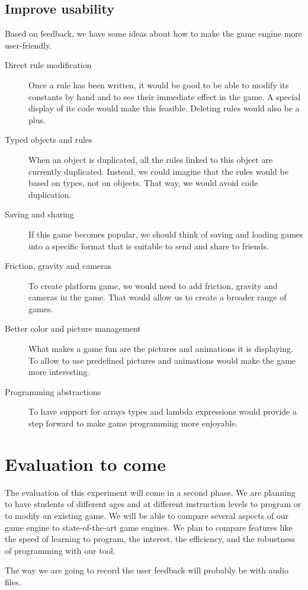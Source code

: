 \documentclass[12pt]{article} %
\begin{document}
\subsection{Improve usability}
Based on feedback, we have some ideas about how to make the game engine more user-friendly.
\begin{description}
\item[Direct rule modification] Once a rule has been written, it would be good
to be able to modify its constants by hand and to see their immediate effect in
the game. A special display of its code would make this feasible. Deleting rules
would also be a plus.
\item[Typed objects and rules] When an object is duplicated, all the rules
linked to this object are currently duplicated. Instead, we could imagine that the rules would
be based on types, not on objects. That way, we would avoid code duplication.
\item[Saving and sharing] If this game becomes popular, we should think of
saving and loading games into a specific format that is suitable to send and
share to friends.
\item[Friction, gravity and cameras] To create platform game, we would need to
add friction, gravity and cameras in the game. That would allow us to create a
broader range of games.
\item[Better color and picture management] What makes a game fun are the
pictures and animations it is displaying. To allow to use predefined pictures and animations
would make the game more interesting.
\item[Programming abstractions] To have support for arrays types and
lambda expressions would provide a step forward to make game programming more
enjoyable.
\end{description}
\section{Evaluation to come}

The evaluation of this experiment will come in a second phase. We are planning
to have students of different ages and at different instruction levels to
program or to modify an existing game. We will be able to compare several
aspects of our game engine to state-of-the-art game engines. We plan to compare
features like the speed of learning to program, the interest, the
efficiency, and the robustness of programming with our tool.

The way we are going to record the user feedback will probably be with audio
files.
\end{document}
